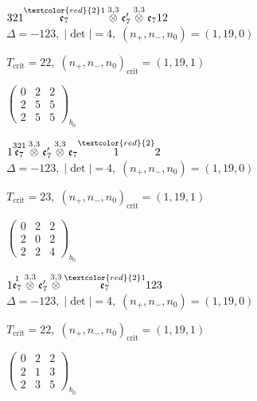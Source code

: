 \documentclass[10pt]{article}
\begin{document}
\smallskip

$321\overset{\textcolor{red}{2}1}{\mathfrak{e}_7}\overset{3,3}{\otimes}\mathfrak{e}_7'\overset{3,3}{\otimes}\mathfrak{e}_712$ \quad $\Delta=-123,\; |\det|=4,\; (n_+,n_-,n_0)=(1,19,0)$

\hspace{1em}$T_{\text{crit}}=22,\; (n_+,n_-,n_0)_{\text{crit}}=(1,19,1)$

\hspace{2em}$\left(\begin{smallmatrix}0 & 2 & 2 \\ 2 & 5 & 5 \\ 2 & 5 & 5\end{smallmatrix}\right)_{\!b_0}$

$1\overset{321}{\mathfrak{e}_7}\overset{3,3}{\otimes}\mathfrak{e}_7'\overset{3,3}{\otimes}\mathfrak{e}_7\overset{\textcolor{red}{2}}{1}2$ \quad $\Delta=-123,\; |\det|=4,\; (n_+,n_-,n_0)=(1,19,0)$

\hspace{1em}$T_{\text{crit}}=23,\; (n_+,n_-,n_0)_{\text{crit}}=(1,19,1)$

\hspace{2em}$\left(\begin{smallmatrix}0 & 2 & 2 \\ 2 & 0 & 2 \\ 2 & 2 & 4\end{smallmatrix}\right)_{\!b_0}$

\smallskip

$1\overset{1}{\mathfrak{e}_7}\overset{3,3}{\otimes}\mathfrak{e}_7'\overset{3,3}{\otimes}\overset{\textcolor{red}{2}1}{\mathfrak{e}_7}123$ \quad $\Delta=-123,\; |\det|=4,\; (n_+,n_-,n_0)=(1,19,0)$

\hspace{1em}$T_{\text{crit}}=22,\; (n_+,n_-,n_0)_{\text{crit}}=(1,19,1)$

\hspace{2em}$\left(\begin{smallmatrix}0 & 2 & 2 \\ 2 & 1 & 3 \\ 2 & 3 & 5\end{smallmatrix}\right)_{\!b_0}$
\end{document}
